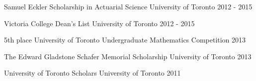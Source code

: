 



\begin{cvhonors}

  \cvhonor
    {Samuel Eckler Scholarship in Actuarial Science} %
    {University of Toronto} %
    {} %
    {2012 - 2015} %

  \cvhonor
    {Victoria College Dean's List} %
    {University of Toronto} %
    {} %
    {2012 - 2015} %

  \cvhonor
    {5th place} %
    {University of Toronto Undergraduate Mathematics Competition} %
    {} %
    {\hphantom{0000- }2013} %

  \cvhonor
    {The Edward Gladstone Schafer Memorial Scholarship} %
    {University of Toronto} %
    {} %
    {\hphantom{0000- }2013} %
    
  \cvhonor
    {University of Toronto Scholars} %
    {University of Toronto} %
    {} %
    {\hphantom{0000-  }2011} %

\end{cvhonors}

